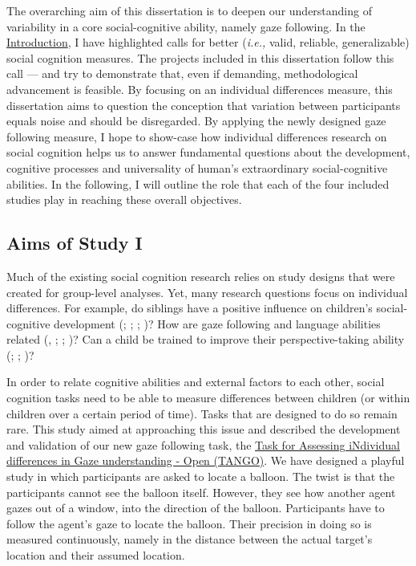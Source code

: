 \documentclass[
]{scrbook}
\begin{document}
The overarching aim of this dissertation is to deepen our understanding of variability in a core social-cognitive ability, namely gaze following. In the \hyperref[introduction]{Introduction}, I have highlighted calls for better (\emph{i.e.,} valid, reliable, generalizable) social cognition measures. The projects included in this dissertation follow this call --- and try to demonstrate that, even if demanding, methodological advancement is feasible. By focusing on an individual differences measure, this dissertation aims to question the conception that variation between participants equals noise and should be disregarded. By applying the newly designed gaze following measure, I hope to show-case how individual differences research on social cognition helps us to answer fundamental questions about the development, cognitive processes and universality of human's extraordinary social-cognitive abilities. In the following, I will outline the role that each of the four included studies play in reaching these overall objectives.

\subsection{Aims of Study I}\label{aimsI}

Much of the existing social cognition research relies on study designs that were created for group-level analyses. Yet, many research questions focus on individual differences. For example, do siblings have a positive influence on children's social-cognitive development (; ; ; )? How are gaze following and language abilities related (, ; ; )? Can a child be trained to improve their perspective-taking ability (; ; )?

In order to relate cognitive abilities and external factors to each other, social cognition tasks need to be able to measure differences between children (or within children over a certain period of time). Tasks that are designed to do so remain rare. This study aimed at approaching this issue and described the development and validation of our new gaze following task, the \hyperref[acronyms_TANGO]{Task for Assessing iNdividual differences in Gaze understanding - Open (TANGO)}. We have designed a playful study in which participants are asked to locate a balloon. The twist is that the participants cannot see the balloon itself. However, they see how another agent gazes out of a window, into the direction of the balloon. Participants have to follow the agent's gaze to locate the balloon. Their precision in doing so is measured continuously, namely in the distance between the actual target's location and their assumed location.
\end{document}

